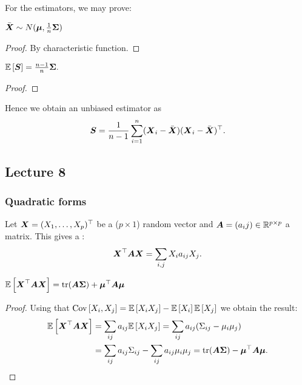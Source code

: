 For the estimators, we may prove:
\begin{proposition}
    $\bar{\boldsymbol{X}} \sim N(\boldsymbol{\mu}, \frac{1}{n}\boldsymbol{\Sigma})$
\end{proposition}
\begin{proof}
    By characteristic function.
\end{proof}
\begin{proposition}
    $\mathbb{E}\left[\boldsymbol{S}\right] = \frac{n-1}{n} \boldsymbol{\Sigma}.$
\end{proposition}
\begin{proof}
    
\end{proof}
Hence we obtain an unbiased estimator as
$$
    \boldsymbol{S} = \frac{1}{n-1} \sum_{i=1}^n (\boldsymbol{X}_i-\bar{\boldsymbol{X}})(\boldsymbol{X}_i-\bar{\boldsymbol{X}})^\top.
$$

\subsection*{Lecture 8}

\subsubsection{Quadratic forms}
Let $\boldsymbol{X}=(X_1,\dots,X_p)^\top$ be a ($p\times 1$) random vector and $\boldsymbol{A}=(a_ij)\in\mathbb{R}^{p\times p}$ a matrix. This gives a :
$$
    \boldsymbol{X}^\top\boldsymbol{A}\boldsymbol{X} = \sum_{i,j} X_ia_{ij}X_j.
$$ 
\begin{theorem} 
    $
        \mathbb{E}\left[\boldsymbol{X}^\top\boldsymbol{A}\boldsymbol{X}\right] = \mathrm{tr}(\boldsymbol{A\Sigma}) + \boldsymbol{\mu}^\top\boldsymbol{A}\boldsymbol{\mu}
    $    
\end{theorem} 
\begin{proof}
    Using that $\mathrm{Cov}\left[X_i,X_j\right] = \mathbb{E}\left[X_iX_j\right]-\mathbb{E}\left[X_i\right]\mathbb{E}\left[X_j\right]$ we obtain the result:
    \begin{align*}
        \mathbb{E}\left[\boldsymbol{X}^\top\boldsymbol{A}\boldsymbol{X}\right]
        &= \sum_{ij}a_{ij}\mathbb{E}\left[X_iX_j\right]
        = \sum_{ij}a_{ij}(\Sigma_{ij}-\mu_i\mu_j)
        \\&= \sum_{ij}a_{ij}\Sigma_{ij} -  \sum_{ij}a_{ij}\mu_i\mu_j
        = \mathrm{tr}(\boldsymbol{A}\boldsymbol{\Sigma}) - \boldsymbol{\mu}^\top\boldsymbol{A}\boldsymbol{\mu}.
    \end{align*}
\end{proof}

